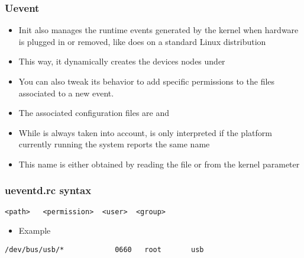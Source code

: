 \begin{frame}
  \frametitle{Uevent}
  \begin{itemize}
  \item Init also manages the runtime events generated by the kernel
    when hardware is plugged in or removed, like  does on a standard
    Linux distribution
  \item This way, it dynamically creates the devices nodes under 
  \item You can also tweak its behavior to add specific permissions to
    the files associated to a new event.
  \item The associated configuration files are  and
  \item While  is always taken into account,
     is only interpreted if the platform
    currently running the system reports the same name
  \item This name is either obtained by reading the file
     or from the 
    kernel parameter
  \end{itemize}
\end{frame}

\begin{frame}[fragile]
  \frametitle{ueventd.rc syntax}
\begin{verbatim}
<path>   <permission>  <user>  <group>
\end{verbatim}
  \begin{itemize}
  \item Example
  \end{itemize}
\begin{verbatim}
/dev/bus/usb/*            0660   root       usb
\end{verbatim}
\end{frame}

